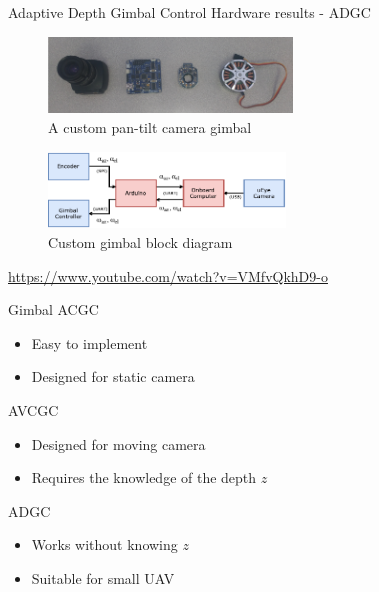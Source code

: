 \documentclass[9pt]{beamer}
\begin{document}
\begin{frame}{Adaptive Depth Gimbal Control}
Hardware results - ADGC
\begin{figure}[htbp]
	\centering
	\includegraphics[height=0.8in]{chapter2/gimbal_parts.png}
	\caption{A custom pan-tilt camera gimbal}
	\label{gimbal_parts}
\end{figure}
\begin{figure}[htbp]
	\centering
	\includegraphics[height=0.8in]{chapter2/gimbal_system_blockdiagram}
	\caption{Custom gimbal block diagram}
	\label{gimbal_blockdiagram}
\end{figure}	
\href{https://www.youtube.com/watch?v=VMfvQkhD9-o}{https://www.youtube.com/watch?v=VMfvQkhD9-o}
\end{frame}

\begin{frame}{Gimbal}
ACGC
\begin{itemize}
	\item Easy to implement
	\item Designed for static camera
\end{itemize}
AVCGC
\begin{itemize}
	\item Designed for moving camera
	\item Requires the knowledge of the depth $z$
\end{itemize}
ADGC
\begin{itemize}
	\item Works without knowing $z$
	\item Suitable for small UAV
\end{itemize}
\end{frame}
\end{document}
